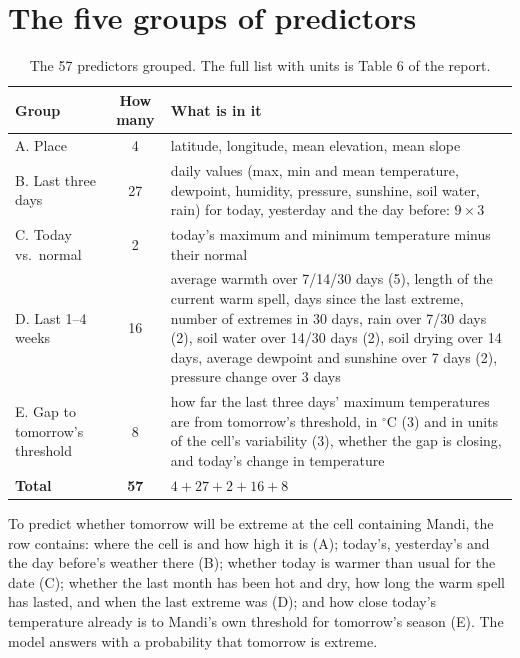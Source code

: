 \section{The five groups of predictors}
\begin{table}[H]
\centering
\caption{The 57 predictors grouped. The full list with units is Table 6 of the report.}
\footnotesize
\begin{tabularx}{\textwidth}{>{\raggedright\arraybackslash}p{3.3cm}c>{\raggedright\arraybackslash}X}
\toprule
\textbf{Group} & \textbf{How many} & \textbf{What is in it}\\
\midrule
A. Place & 4 & latitude, longitude, mean elevation, mean slope\\
B. Last three days & 27 & 9 daily values (max, min and mean temperature, dewpoint, humidity, pressure, sunshine, soil
  water, rain) for today, yesterday and the day before: $9\times3$\\
C. Today vs.\ normal & 2 & today's maximum and minimum temperature minus their normal\\
D. Last 1--4 weeks & 16 & average warmth over 7/14/30 days (5), length of the current warm spell, days since the last
  extreme, number of extremes in 30 days, rain over 7/30 days (2), soil water over 14/30 days (2), soil drying over 14
  days, average dewpoint and sunshine over 7 days (2), pressure change over 3 days\\
E. Gap to tomorrow's threshold & 8 & how far the last three days' maximum temperatures are from tomorrow's threshold, in
  $^\circ$C (3) and in units of the cell's variability (3), whether the gap is closing, and today's change in
  temperature\\
\midrule
\textbf{Total} & \textbf{57} & $4+27+2+16+8$\\
\bottomrule
\end{tabularx}
\end{table}

\begin{example}
To predict whether tomorrow will be extreme at the cell containing Mandi, the row contains: where the cell is and how
high it is (A); today's, yesterday's and the day before's weather there (B); whether today is warmer than usual for the
date (C); whether the last month has been hot and dry, how long the warm spell has lasted, and when the last extreme was
(D); and how close today's temperature already is to Mandi's own threshold for tomorrow's season (E). The model answers
with a probability that tomorrow is extreme.
\end{example}

